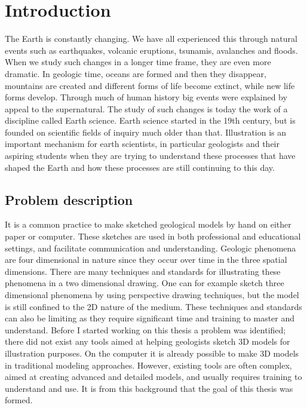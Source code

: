 \documentclass[a4paper,12pt]{report}
\begin{document}
\clearpage

\tableofcontents 



\clearpage

\pagestyle{plain}


\chapter{Introduction}
\label{sec:intro}

The Earth is constantly changing. We have all experienced this through natural events such as earthquakes, volcanic eruptions, tsunamis, avalanches and floods. When we study such changes in a longer time frame, they are even more dramatic. In geologic time, oceans are formed and then they disappear, mountains are created and different forms of life become extinct, while new life forms develop. Through much of human history big events were explained by appeal to the supernatural. The study of such changes is today the work of a discipline called Earth science. Earth science started in the 19th century, but is founded on scientific fields of inquiry much older than that. Illustration is an important mechanism for earth scientists, in particular geologists and their aspiring students when they are trying to understand these processes that have shaped the Earth and how these processes are still continuing to this day.

\section{Problem description}

It is a common practice to make sketched geological models by hand on either paper or computer. These sketches are used in both professional and educational settings, and facilitate communication and understanding. Geologic phenomena are four dimensional in nature since they occur over time in the three spatial dimensions. There are many techniques and standards for illustrating these phenomena in a two dimensional drawing. One can for example sketch three dimensional phenomena by using perspective drawing techniques, but the model is still confined to the 2D nature of the medium. These techniques and standards can also be limiting  as they require significant time and training to master and understand. Before I started working on this thesis a problem was identified; there did not exist any tools aimed at helping geologists sketch 3D models for illustration purposes. On the computer it is already possible to make 3D models in traditional modeling approaches. However, existing tools are often complex, aimed at creating advanced and detailed models, and usually requires training to understand and use. It is from this background that the goal of this thesis was formed. 
\end{document}
